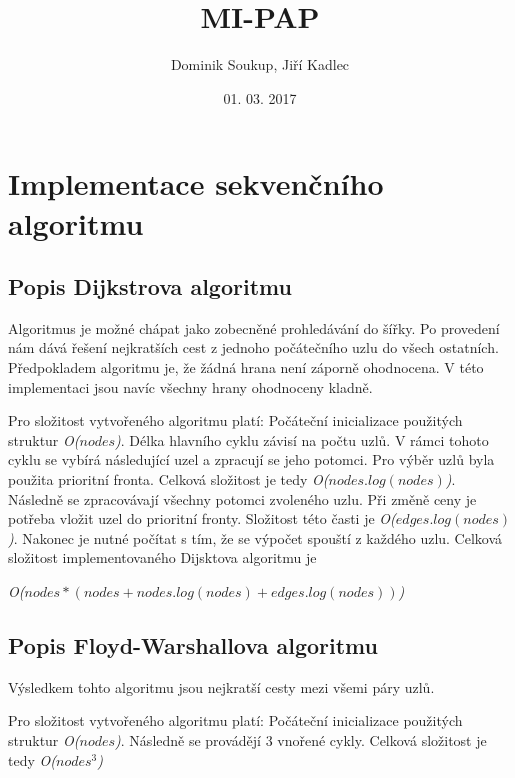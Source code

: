 \documentclass[a4paper,11pt]{article}
\title{\textbf{MI-PAP}}
\author{Dominik Soukup, Jiří Kadlec}
\date{01. 03. 2017}
\begin{document}
\maketitle
\thispagestyle{empty}
\newpage
\tableofcontents
\thispagestyle{empty}
\newpage


\section{Implementace sekvenčního algoritmu}

\subsection{Popis Dijkstrova algoritmu}
Algoritmus je možné chápat jako zobecněné prohledávání do šířky. Po provedení nám dává řešení nejkratších
cest z jednoho počátečního uzlu do všech ostatních. Předpokladem algoritmu je, že žádná hrana není záporně
ohodnocena. V této implementaci jsou navíc všechny hrany ohodnoceny kladně.

Pro složitost vytvořeného algoritmu platí:
Počáteční inicializace použitých struktur \textit{O(${nodes}$)}. Délka hlavního cyklu závisí na počtu uzlů.
V rámci tohoto cyklu se vybírá následující uzel a zpracují se jeho potomci. Pro výběr uzlů byla použita
prioritní fronta. Celková složitost je tedy  \textit{O(${nodes . log(nodes)}$)}.
Následně se zpracovávají všechny potomci zvoleného uzlu. Při změně ceny je potřeba vložit uzel do prioritní
fronty. Složitost této časti je \textit{O(${edges . log(nodes)}$)}. Nakonec je nutné počítat s tím, 
že se výpočet spouští z každého uzlu. 
Celková složitost implementovaného Dijsktova algoritmu je\-

\textit{O(${nodes*(nodes+nodes . log(nodes)+edges . log(nodes))}$)}

\subsection{Popis Floyd-Warshallova algoritmu}
Výsledkem tohto algoritmu jsou nejkratší cesty mezi všemi páry uzlů.

Pro složitost vytvořeného algoritmu platí:
Počáteční inicializace použitých struktur \textit{O(${nodes}$)}. Následně se provádějí 3 vnořené cykly.
Celková složitost je tedy \textit{O(${nodes^3}$)}
\end{document}
